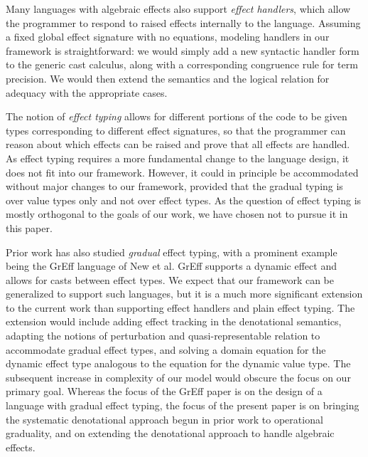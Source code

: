 \documentclass[acmsmall,screen,review,anonymous]{acmart}
\theoremstyle{remark}
\begin{document}
Many languages with algebraic effects also support \emph{effect handlers}, which
allow the programmer to respond to raised effects internally to the language.
%
Assuming a fixed global effect signature with no equations, modeling handlers in
our framework is straightforward: we would simply add a new syntactic handler
form to the generic cast calculus, along with a corresponding congruence rule
for term precision. We would then extend the semantics and the logical relation
for adequacy with the appropriate cases.

The notion of \emph{effect typing} allows for different portions of the code to
be given types corresponding to different effect signatures, so that the
programmer can reason about which effects can be raised and prove that all
effects are handled. As effect typing requires a more fundamental change to the
language design, it does not fit into our framework. However, it could in
principle be accommodated without major changes to our framework, provided that
the gradual typing is over value types only and not over effect types. As the
question of effect typing is mostly orthogonal to the goals of our work, we have
chosen not to pursue it in this paper.

Prior work has also studied \emph{gradual} effect typing, with a prominent
example being the GrEff language \cite{new-giovannini-licata-2022} of New et al.
GrEff supports a dynamic effect and allows for casts between effect types. We
expect that our framework can be generalized to support such languages, but it
is a much more significant extension to the current work than supporting
effect handlers and plain effect typing. 
%
The extension would include adding effect tracking in the denotational
semantics, adapting the notions of perturbation and quasi-representable relation
to accommodate gradual effect types, and solving a domain equation for the
dynamic effect type analogous to the equation for the dynamic value type.
%
The subsequent increase in complexity of our model would obscure the focus on
our primary goal. Whereas the focus of the GrEff paper is on the design of a
language with gradual effect typing, the focus of the present paper is on
bringing the systematic denotational approach begun in prior work to operational
graduality, and on extending the denotational approach to handle algebraic
effects.
\end{document}
